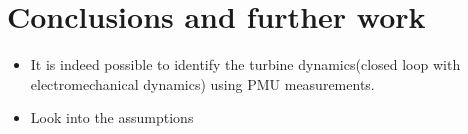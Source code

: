 \section{Conclusions and further work}
\begin{frame}
	\begin{itemize}
		\item It is indeed possible to identify the turbine dynamics(closed loop with electromechanical dynamics) using PMU measurements.
		\item Look into the assumptions
	\end{itemize}
\end{frame}
